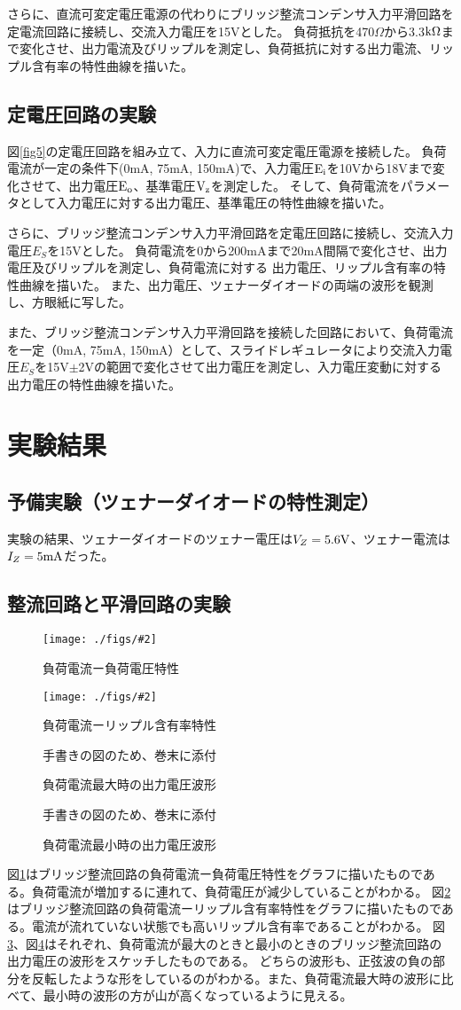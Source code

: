 \documentclass[11pt]{jsarticle}
\newcommand{\fg}[3]{ %
    \begin{figure}
        \begin{center}
            \texttt{[image: ./figs/\#2]}
            \caption{#3}
            \label{#1}
        \end{center}
    \end{figure}
}
\newcommand{\dummyfig}[2]{
    \begin{figure}
        \begin{center}
            \begin{shadebox}
                手書きの図のため、巻末に添付
            \end{shadebox}
            \caption{#2}
            \label{#1}
        \end{center}
    \end{figure}
}
\newcommand{\fr}[1]{図\ref{#1}}
\begin{document}
さらに、直流可変定電圧電源の代わりにブリッジ整流コンデンサ入力平滑回路を定電流回路に接続し、交流入力電圧を15Vとした。
負荷抵抗を470$\Omega$から3.3${\rm k}\Omega$まで変化させ、出力電流及びリップルを測定し、負荷抵抗に対する出力電流、リップル含有率の特性曲線を描いた。

\subsection{定電圧回路の実験}
\fr{fig5}の定電圧回路を組み立て、入力に直流可変定電圧電源を接続した。
負荷電流が一定の条件下(0mA, 75mA, 150mA)で、入力電圧${\rm E_i}$を10Vから18Vまで変化させて、出力電圧${\rm E_o}$、基準電圧${\rm V_z}$を測定した。
そして、負荷電流をパラメータとして入力電圧に対する出力電圧、基準電圧の特性曲線を描いた。

さらに、ブリッジ整流コンデンサ入力平滑回路を定電圧回路に接続し、交流入力電圧$E_S$を15Vとした。
負荷電流を0から200mAまで20mA間隔で変化させ、出力電圧及びリップルを測定し、負荷電流に対する
出力電圧、リップル含有率の特性曲線を描いた。
また、出力電圧、ツェナーダイオードの両端の波形を観測し、方眼紙に写した。

また、ブリッジ整流コンデンサ入力平滑回路を接続した回路において、負荷電流を一定（0mA, 75mA, 150mA）として、スライドレギュレータにより交流入力電圧$E_S$を15V$\pm$2Vの範囲で変化させて出力電圧を測定し、入力電圧変動に対する出力電圧の特性曲線を描いた。

\section{実験結果}
\subsection{予備実験（ツェナーダイオードの特性測定）}
実験の結果、ツェナーダイオードのツェナー電圧は$V_Z = 5.6{\rm V}$、ツェナー電流は$I_Z = 5{\rm mA}$だった。

\subsection{整流回路と平滑回路の実験}
\fg{fig6}{{1.voltage}.png}{負荷電流ー負荷電圧特性}
\fg{fig7}{{1.ripple}.png}{負荷電流ーリップル含有率特性}
\dummyfig{fig8}{負荷電流最大時の出力電圧波形}
\dummyfig{fig9}{負荷電流最小時の出力電圧波形}

\fr{fig6}はブリッジ整流回路の負荷電流ー負荷電圧特性をグラフに描いたものである。負荷電流が増加するに連れて、負荷電圧が減少していることがわかる。
\fr{fig7}はブリッジ整流回路の負荷電流ーリップル含有率特性をグラフに描いたものである。電流が流れていない状態でも高いリップル含有率であることがわかる。
\fr{fig8}、\fr{fig9}はそれぞれ、負荷電流が最大のときと最小のときのブリッジ整流回路の出力電圧の波形をスケッチしたものである。
どちらの波形も、正弦波の負の部分を反転したような形をしているのがわかる。また、負荷電流最大時の波形に比べて、最小時の波形の方が山が高くなっているように見える。
\end{document}
